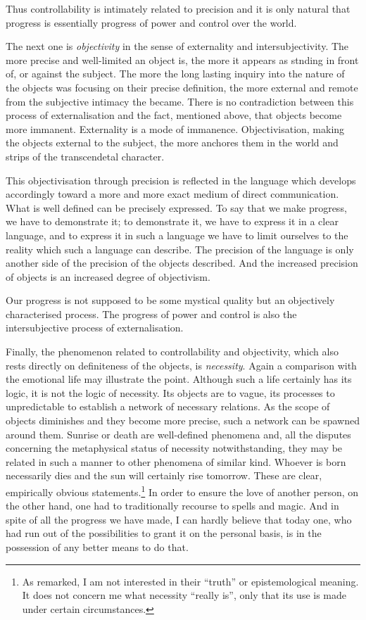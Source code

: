 Thus controllability is intimately related to precision and it is only natural
that progress is essentially progress of power and control over the world.

The next one is {\em objectivity} in the sense of externality and 
intersubjectivity. The more precise and well-limited an object is, the more it
appears as stnding in front of, or against the subject. The more the long
lasting inquiry into the nature of the objects was focusing on their precise
definition, the more external and remote from the subjective intimacy the 
became. There is no contradiction between this process of externalisation and
the fact, mentioned above, that objects become more immanent. Externality is
a mode of immanence. Objectivisation, making the objects external to the 
subject, the more anchores them in the world and strips of the transcendetal
character.

This objectivisation through precision is reflected in the language which 
develops accordingly toward a more and more exact medium of direct 
communication. What is well defined can be precisely expressed. To say
that we make progress, we have to demonstrate it; to demonstrate it, we have
to express it in a clear language, and to express it in such a language we
have to limit ourselves to the reality which such a language can describe.
The precision of the language is only another side of the precision of the 
objects described. And the increased precision of objects is an increased
degree of objectivism. 

Our progress is not supposed to be some mystical
quality but an objectively characterised process. The progress of power and 
control is also the intersubjective process of externalisation.

Finally, the phenomenon related to controllability and objectivity, which also
rests directly on definiteness of the objects, is {\em necessity}. Again a 
comparison with the emotional life may illustrate the point. Although such a
life certainly has its logic, it is not the logic of necessity. Its objects 
are to vague, its processes to unpredictable to establish a network of
necessary relations. As the scope of objects diminishes and they become more
precise, such a network can be spawned around them. Sunrise or death are
well-defined phenomena and, all the disputes concerning the metaphysical
status of necessity notwithstanding, they may be related in such a manner to
other phenomena of similar kind. Whoever is born necessarily dies and the sun
will certainly rise tomorrow. These are clear, empirically obvious 
statements.\footnote{As remarked, I am not interested in their ``truth'' or
epistemological meaning. It does not concern me what necessity ``really is'',
only that its use is made under certain circumstances.} In order to ensure the
love of another person, on the other hand, one had to traditionally recourse
to spells and magic. And in spite of all the progress we have made, I can 
hardly believe that today one, who had run out of the possibilities to grant
it on the personal basis, is in the possession of any better means to do that.

